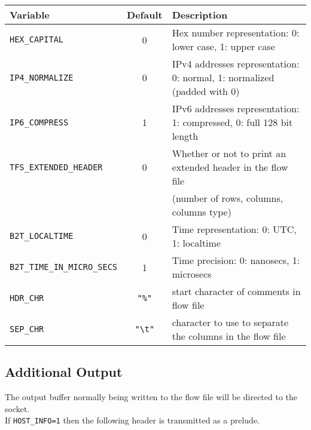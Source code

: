 \documentclass[documentation]{subfiles}
\begin{document}
\begin{longtable}{lcl}
    \toprule
    {\bf Variable} & {\bf Default} & {\bf Description}\\
    \midrule\endhead%
    {\tt HEX\_CAPITAL}          & 0 & Hex number representation: 0: lower case, 1: upper case\\
    {\tt IP4\_NORMALIZE}        & 0 & IPv4 addresses representation: 0: normal, 1: normalized (padded with 0)\\
    {\tt IP6\_COMPRESS}         & 1 & IPv6 addresses representation: 1: compressed, 0: full 128 bit length \\
    {\tt TFS\_EXTENDED\_HEADER} & 0 & Whether or not to print an extended header in the flow file\\
                                &   & (number of rows, columns, columns type)\\
    {\tt B2T\_LOCALTIME}        & 0 & Time representation: 0: UTC, 1: localtime\\
    {\tt B2T\_TIME\_IN\_MICRO\_SECS} & 1 & Time precision: 0: nanosecs, 1: microsecs\\
    {\tt HDR\_CHR} & {\tt "\%"} & start character of comments in flow file\\
    {\tt SEP\_CHR} & {\tt "\textbackslash{}t"} & character to use to separate the columns in the flow file\\
    \bottomrule
\end{longtable}

%

\subsection{Additional Output}
The output buffer normally being written to the flow file will be directed to the socket.\\

If {\tt HOST\_INFO=1} then the following header is transmitted as a prelude.
\end{document}

